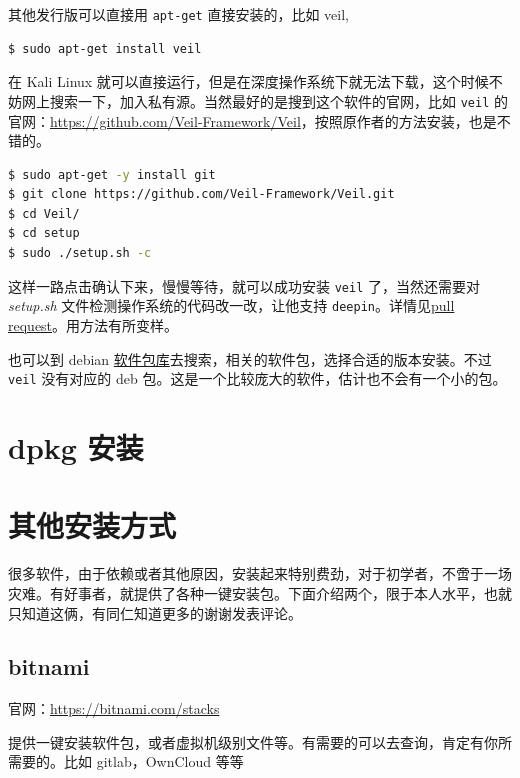 \documentclass[doctor,openright,twoside]{sjtuthesis}
\newcommand{\passthrough}[1]{#1}
\theoremstyle{plain}
\theoremstyle{definition}
\theoremstyle{remark}
\theoremstyle{ocrenumbox}
\theoremstyle{plain}
\begin{document}
其他发行版可以直接用 \passthrough{\lstinline!apt-get!} 直接安装的，比如
veil,

\begin{lstlisting}[language=bash]
$ sudo apt-get install veil
\end{lstlisting}

在 Kali Linux
就可以直接运行，但是在深度操作系统下就无法下载，这个时候不妨网上搜索一下，加入私有源。当然最好的是搜到这个软件的官网，比如
\passthrough{\lstinline!veil!}
的官网：\url{https://github.com/Veil-Framework/Veil}，按照原作者的方法安装，也是不错的。

\begin{lstlisting}[language=bash]
$ sudo apt-get -y install git
$ git clone https://github.com/Veil-Framework/Veil.git
$ cd Veil/
$ cd setup
$ sudo ./setup.sh -c
\end{lstlisting}

这样一路点击确认下来，慢慢等待，就可以成功安装
\passthrough{\lstinline!veil!} 了，当然还需要对 \emph{setup.sh}
文件检测操作系统的代码改一改，让他支持
\passthrough{\lstinline!deepin!}。详情见\href{https://github.com/Veil-Framework/Veil/pull/130}{pull
request}。用方法有所变样。

也可以到 debian
\href{http://www.debian.org/distrib/packages}{软件包库}去搜索，相关的软件包，选择合适的版本安装。不过
\passthrough{\lstinline!veil!} 没有对应的 deb
包。这是一个比较庞大的软件，估计也不会有一个小的包。

\hypertarget{dpkg-}{%
\section{dpkg 安装}\label{dpkg-}}

\section{其他安装方式}

很多软件，由于依赖或者其他原因，安装起来特别费劲，对于初学者，不啻于一场灾难。有好事者，就提供了各种一键安装包。下面介绍两个，限于本人水平，也就只知道这俩，有同仁知道更多的谢谢发表评论。

\hypertarget{bitnami}{%
\subsection{bitnami}\label{bitnami}}

官网：\url{https://bitnami.com/stacks}

提供一键安装软件包，或者虚拟机级别文件等。有需要的可以去查询，肯定有你所需要的。比如
gitlab，OwnCloud 等等
\end{document}
